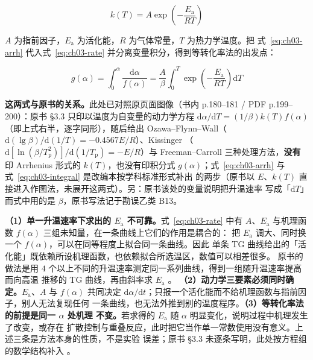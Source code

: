 \begin{equation}\label{eq:ch03-arrh}
k(T)=A\exp\!\left(-\frac{E_{\mathrm{a}}}{RT}\right)
\end{equation}

$A$ 为指前因子，$E_{\mathrm{a}}$ 为活化能，$R$ 为气体常量，$T$ 为热力学温度。把
式~\eqref{eq:ch03-arrh} 代入式~\eqref{eq:ch03-rate} 并分离变量积分，得到等转化率法的出发点：

\begin{equation}\label{eq:ch03-integral}
g(\alpha)=\int_0^{\alpha}\frac{\mathrm{d}\alpha}{f(\alpha)}
=\frac{A}{\beta}\int_0^{T}\exp\!\left(-\frac{E_{\mathrm{a}}}{RT}\right)\mathrm{d}T
\end{equation}

\textbf{这两式与原书的关系。}此处已对照原页面图像（书内 p.180--181 / PDF p.199--200）：原书
§3.3 只印以温度为自变量的动力学方程
$\mathrm{d}\alpha/\mathrm{d}T=(1/\beta)k(T)f(\alpha)$（即上式右半，逐字同形），随后给出
Ozawa--Flynn--Wall（$\mathrm{d}(\lg\beta)/\mathrm{d}(1/T)=-0.4567E/R$）、Kissinger
（$\mathrm{d}[\ln(\beta/T_{\mathrm{p}}^{2})]/\mathrm{d}(1/T_{\mathrm{p}})=-E/R$）与
Freeman--Carroll 三种处理方法，\textbf{没有}印 Arrhenius 形式的 $k(T)$，也没有印积分式
$g(\alpha)$；式~\eqref{eq:ch03-arrh} 与式~\eqref{eq:ch03-integral} 是改编本按学科标准形式补出
的两步（原书以 $E$、$k(T)$ 直接进入作图法，未展开这两式）。另：原书该处的变量说明把升温速率
写成「$\mathrm{d}T$」而式中用的是 $\beta$，原书写法记于勘误乙类 B13。

\begin{keycond}
\textbf{（1）单一升温速率下求出的 $E_{\mathrm{a}}$ 不可靠。}式~\eqref{eq:ch03-rate} 中有
$A$、$E_{\mathrm{a}}$ 与机理函数 $f(\alpha)$ 三组未知量，在一条曲线上它们的作用是耦合的：
把 $E_{\mathrm{a}}$ 调大、同时换一个 $f(\alpha)$，可以在同等程度上拟合同一条曲线。因此
单条 TG 曲线给出的「活化能」既依赖所设机理函数，也依赖拟合所选温区，数值可以相差很多。
原书的做法是用 $4$ 个以上不同的升温速率测定同一系列曲线，得到一组随升温速率提高而向高温
推移的 TG 曲线，再由斜率求 $E_{\mathrm{a}}$ 。
\textbf{（2）动力学三要素必须同时确定。}$E_{\mathrm{a}}$、$A$ 与 $f(\alpha)$ 共同决定
$\mathrm{d}\alpha/\mathrm{d}t$；只报一个活化能而不给机理函数与指前因子，别人无法复现任何
一条曲线，也无法外推到别的温度程序。\textbf{（3）等转化率法的前提是同一 $\alpha$ 处机理
不变。}若求得的 $E_{\mathrm{a}}$ 随 $\alpha$ 明显变化，说明过程中机理发生了改变，或存在
扩散控制与重叠反应，此时把它当作单一常数使用没有意义。上述三条是方法本身的性质，不是实验
误差；原书 §3.3 未逐条写明，此处按方程组的数学结构补入
。
\end{keycond}

